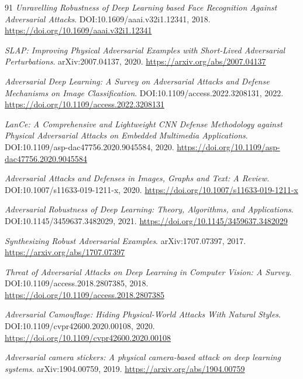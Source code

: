 \documentclass[11pt,a4paper]{article}
\begin{document}
\begin{thebibliography}{91}
\newblock \emph{Unravelling Robustness of Deep Learning based Face Recognition Against Adversarial Attacks}.
\newblock DOI:10.1609/aaai.v32i1.12341, 2018.
\newblock \url{https://doi.org/10.1609/aaai.v32i1.12341}

\newblock \emph{SLAP: Improving Physical Adversarial Examples with Short-Lived Adversarial Perturbations}.
\newblock arXiv:2007.04137, 2020.
\newblock \url{https://arxiv.org/abs/2007.04137}

\newblock \emph{Adversarial Deep Learning: A Survey on Adversarial Attacks and Defense Mechanisms on Image Classification}.
\newblock DOI:10.1109/access.2022.3208131, 2022.
\newblock \url{https://doi.org/10.1109/access.2022.3208131}

\newblock \emph{LanCe: A Comprehensive and Lightweight CNN Defense Methodology against Physical Adversarial Attacks on Embedded Multimedia Applications}.
\newblock DOI:10.1109/asp-dac47756.2020.9045584, 2020.
\newblock \url{https://doi.org/10.1109/asp-dac47756.2020.9045584}

\newblock \emph{Adversarial Attacks and Defenses in Images, Graphs and Text: A Review}.
\newblock DOI:10.1007/s11633-019-1211-x, 2020.
\newblock \url{https://doi.org/10.1007/s11633-019-1211-x}

\newblock \emph{Adversarial Robustness of Deep Learning: Theory, Algorithms, and Applications}.
\newblock DOI:10.1145/3459637.3482029, 2021.
\newblock \url{https://doi.org/10.1145/3459637.3482029}

\newblock \emph{Synthesizing Robust Adversarial Examples}.
\newblock arXiv:1707.07397, 2017.
\newblock \url{https://arxiv.org/abs/1707.07397}

\newblock \emph{Threat of Adversarial Attacks on Deep Learning in Computer Vision: A Survey}.
\newblock DOI:10.1109/access.2018.2807385, 2018.
\newblock \url{https://doi.org/10.1109/access.2018.2807385}

\newblock \emph{Adversarial Camouflage: Hiding Physical-World Attacks With Natural Styles}.
\newblock DOI:10.1109/cvpr42600.2020.00108, 2020.
\newblock \url{https://doi.org/10.1109/cvpr42600.2020.00108}

\newblock \emph{Adversarial camera stickers: A physical camera-based attack on deep learning systems}.
\newblock arXiv:1904.00759, 2019.
\newblock \url{https://arxiv.org/abs/1904.00759}


\end{thebibliography}
\end{document}
